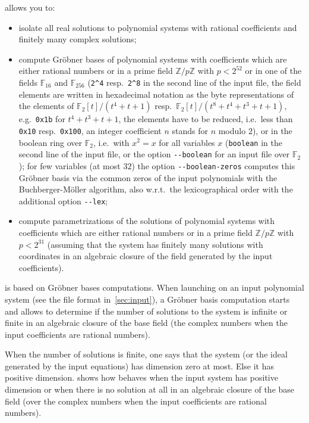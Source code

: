 \documentclass[a4paper,english,11pt]{scrartcl}
\theoremstyle{definition}
\theoremstyle{remark}
\begin{document}
\msolve allows you to:
\begin{itemize}
\item isolate all real solutions to polynomial systems with rational
  coefficients and finitely many complex solutions;
\item compute Gr\"obner bases of polynomial systems with coefficients which are
  either rational numbers or in a prime field $\mathbb{Z}/p\mathbb{Z}$ with $p <
  2^{52}$ or in one of the fields $\mathbb{F}_{16}$ and $\mathbb{F}_{256}$
  (\verb+2^4+ resp.\ \verb+2^8+ in the second line of the input file, the
  field elements are written in hexadecimal notation as the byte
  representations of the elements of $\mathbb{F}_2[t]/(t^4+t+1)$ resp.\
  $\mathbb{F}_2[t]/(t^8+t^4+t^3+t+1)$, e.g.\ \verb+0x1b+ for $t^4+t^3+t+1$,
  the elements have to be reduced, i.e.\ less than \verb+0x10+ resp.\
  \verb+0x100+, an integer coefficient $n$ stands for $n$ modulo $2$), or in the boolean
  ring over $\mathbb{F}_2$, i.e.\ with $x^2 = x$ for all variables $x$
  (\verb+boolean+ in the second line of the input file, or the option
  \verb+--boolean+ for an input file over $\mathbb{F}_2$); for few variables
  (at most $32$) the option \verb+--boolean-zeros+ computes this Gr\"obner
  basis via the common zeros of the input polynomials with the
  Buchberger-M\"oller algorithm, also w.r.t.\ the lexicographical order
  with the additional option \verb+--lex+;
\item compute parametrizations of the solutions of polynomial systems with
  coefficients which are either rational numbers or in a prime field
  $\mathbb{Z}/p\mathbb{Z}$ with $p < 2^{31}$ (assuming that the system has
  finitely many solutions with coordinates in an algebraic closure of the field
  generated by the input coefficients).
\end{itemize}

\msolve is based on Gr\"obner bases computations. When launching \msolve on
an input polynomial system (see the file format in~\cref{sec:input}), a Gr\"obner
basis computation starts and allows \msolve to determine if the number of solutions
to the system is infinite or finite in an algebraic closure of the base field
(the complex numbers when the input coefficients are rational numbers).

When the number of solutions is finite, one says that the system (or the ideal
generated by the input equations) has dimension zero at most. Else it has positive
dimension.
\Cref{sec:dim} shows how \msolve behaves when the input system has positive dimension
or when there is no solution at all in an algebraic closure of the base field (over
the complex numbers when the input coefficients are rational numbers).
\end{document}
